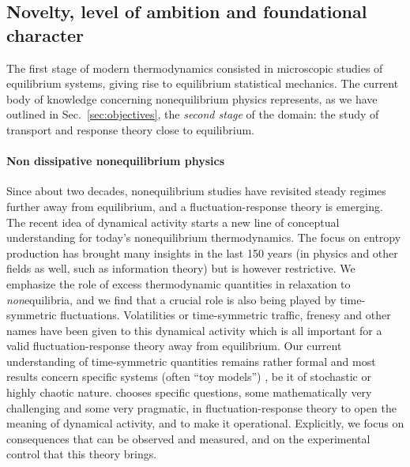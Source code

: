 \subsection{Novelty, level of ambition and foundational character}\label{sec:progress}


The first stage of modern thermodynamics consisted in microscopic studies of equilibrium systems, giving rise to equilibrium statistical mechanics. The current body of knowledge concerning nonequilibrium
physics represents, as we have outlined in Sec.~\ref{sec:objectives}, the {\em second stage}
of the domain: the study of transport and response theory close to
equilibrium.

\paragraph{Non dissipative nonequilibrium physics}
Since about two decades, nonequilibrium studies have revisited steady regimes further away
from equilibrium, and a fluctuation-response theory is  emerging.
The recent idea of dynamical activity starts a new line of conceptual
understanding for today's nonequilibrium thermodynamics. The focus on
entropy production has brought many insights in the last 150 years (in physics and other
fields as well, such as information theory) but is however restrictive.  We emphasize the role of excess thermodynamic quantities in relaxation to {\it non}equilibria, and we find that a crucial role is also being played by time-symmetric fluctuations.
Volatilities or time-symmetric traffic, frenesy and other names have been given to this dynamical activity which is all important  for a valid fluctuation-response theory away from equilibrium.
 Our current
understanding of time-symmetric quantities remains rather formal and most results concern
specific systems (often ``toy models'') , be it of stochastic or highly chaotic nature.
%
\TheProject chooses specific questions, some mathematically very challenging and some very
pragmatic, in fluctuation-response theory to open the meaning of dynamical activity, and to
make it operational.
%
Explicitly, we focus on consequences that can be observed and measured, and on the
experimental control that this theory brings.

